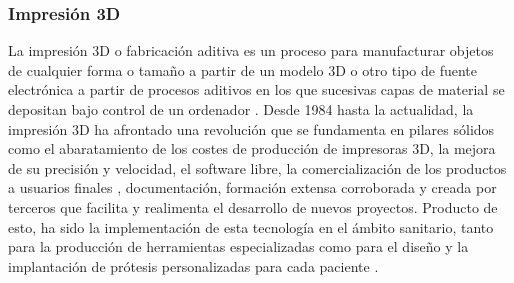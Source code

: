 \subsubsection{Impresión 3D}
La impresión 3D o fabricación aditiva es un proceso para manufacturar objetos de cualquier forma o tamaño a partir de un modelo 3D o otro tipo de fuente electrónica a partir de procesos aditivos en los que sucesivas capas de material se depositan bajo control de un ordenador \cite{yan_dong_su_han_song_wei_shi_2018}.
Desde 1984 \cite{ChanaRodrguez2016} hasta la actualidad, la impresión 3D ha afrontado una revolución que se fundamenta en pilares sólidos como el abaratamiento de los costes de producción de impresoras 3D, la mejora de su precisión y velocidad, el software libre, la comercialización de los productos a usuarios finales , documentación, formación extensa corroborada y creada por terceros que facilita y realimenta el desarrollo de nuevos proyectos.
Producto de esto, ha sido la implementación de esta tecnología en el ámbito sanitario, tanto para la producción de herramientas especializadas \cite{ChanaRodrguez2016} como para el diseño y la implantación de prótesis personalizadas para cada paciente \cite{Gonzalez_Alvarez_2021}.



